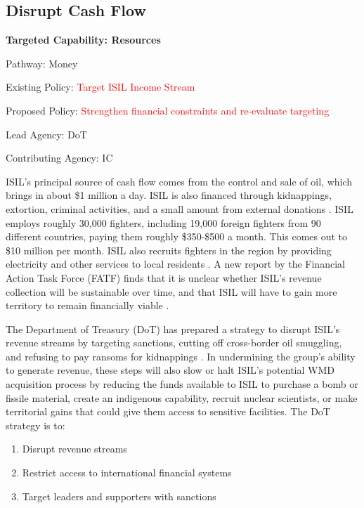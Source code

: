 \documentclass{report}
\begin{document}
\subsection{Disrupt Cash Flow}

\bfseries Targeted Capability: Resources 

Pathway: Money 

Existing Policy: \textcolor{red}{Target ISIL Income Stream}

Proposed Policy: \textcolor{red}{Strengthen financial constraints and re-evaluate targeting}  

Lead Agency: DoT

Contributing Agency: IC \normalfont


ISIL's principal source of cash flow comes from the control and sale of oil, which brings in about \$1 million a day. ISIL is also financed through kidnappings, extortion, criminal activities, and a small amount from external donations \cite{Lister2014}. ISIL employs roughly 30,000 fighters, including 19,000 foreign fighters from 90 different countries, paying them roughly \$350-\$500 a month. This comes out to \$10 million per month. ISIL also recruits fighters in the region by providing electricity and other services to local residents \cite{TheEditorialBoard2015}. A new report by the  Financial Action Task Force (FATF) finds that it is unclear whether ISIL's revenue collection will be sustainable over time, and that ISIL will have to gain more territory to remain financially viable \cite{TheEditorialBoard2015,Report2015}.

The Department of Treasury (DoT) has prepared a strategy to disrupt ISIL's revenue streams by targeting sanctions, cutting off cross-border oil smuggling, and refusing to pay ransoms for kidnappings \cite{Cohen2014}. In undermining the group's ability to generate revenue, these steps will also slow or halt ISIL's potential WMD acquisition process by reducing the funds available to ISIL to purchase a bomb or fissile material, create an indigenous capability, recruit nuclear scientists, or make territorial gains that could give them access to sensitive facilities. The DoT strategy is to:

\begin{enumerate}
 \item Disrupt revenue streams
 \item Restrict access to international financial systems
 \item Target leaders and supporters with sanctions
\end{enumerate}
\end{document}
